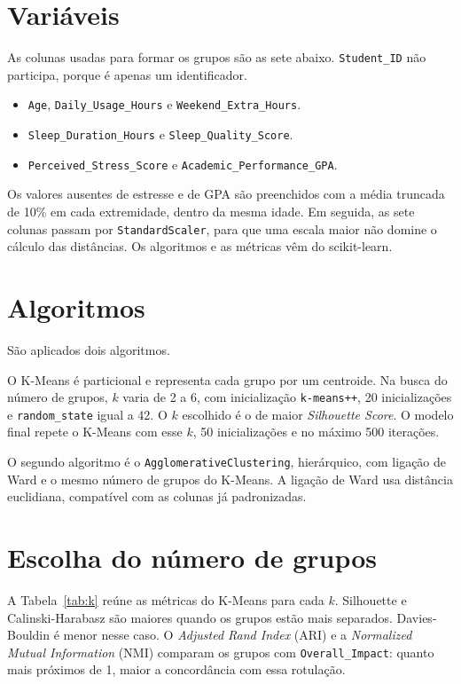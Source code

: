 \documentclass[
  article,
  12pt,
  oneside,
  a4paper,
  english,
  brazil,
  chapter=TITLE,
  section=TITLE,
  subsection=TITLE
]{abntex2}
\begin{document}
\section{Variáveis}

As colunas usadas para formar os grupos são as sete abaixo. \texttt{Student\_ID} não participa, porque é apenas um identificador.

\begin{itemize}[topsep=4pt,itemsep=1pt,parsep=0pt]
  \item \texttt{Age}, \texttt{Daily\_Usage\_Hours} e \texttt{Weekend\_Extra\_Hours}.
  \item \texttt{Sleep\_Duration\_Hours} e \texttt{Sleep\_Quality\_Score}.
  \item \texttt{Perceived\_Stress\_Score} e \texttt{Academic\_Performance\_GPA}.
\end{itemize}

Os valores ausentes de estresse e de GPA são preenchidos com a média truncada de 10\% em cada extremidade, dentro da mesma idade. Em seguida, as sete colunas passam por \texttt{StandardScaler}, para que uma escala maior não domine o cálculo das distâncias. Os algoritmos e as métricas vêm do scikit-learn.

\section{Algoritmos}

São aplicados dois algoritmos.

O K-Means é particional e representa cada grupo por um centroide. Na busca do número de grupos, \(k\) varia de 2 a 6, com inicialização \texttt{k-means++}, 20 inicializações e \texttt{random\_state} igual a 42. O \(k\) escolhido é o de maior \textit{Silhouette Score}. O modelo final repete o K-Means com esse \(k\), 50 inicializações e no máximo 500 iterações.

O segundo algoritmo é o \texttt{AgglomerativeClustering}, hierárquico, com ligação de Ward e o mesmo número de grupos do K-Means. A ligação de Ward usa distância euclidiana, compatível com as colunas já padronizadas.

\section{Escolha do número de grupos}

A Tabela~\ref{tab:k} reúne as métricas do K-Means para cada \(k\). Silhouette e Calinski-Harabasz são maiores quando os grupos estão mais separados. Davies-Bouldin é menor nesse caso. O \textit{Adjusted Rand Index} (ARI) e a \textit{Normalized Mutual Information} (NMI) comparam os grupos com \texttt{Overall\_Impact}: quanto mais próximos de 1, maior a concordância com essa rotulação.
\end{document}
